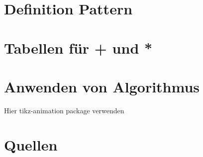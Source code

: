 \documentclass[t]{beamer}
\begin{document}
    \section{Definition Pattern}
    \begin{frame}

    \end{frame}

    \section{Tabellen für + und *}
    \begin{frame}

    \end{frame}

    \section{Anwenden von Algorithmus}
    \begin{frame}
        Hier tikz-animation package verwenden
    \end{frame}


    \section{Quellen}
    \begin{frame}[allowframebreaks]
        
        
    \end{frame}
\end{document}
